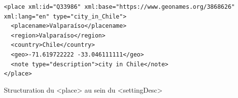 \begin{listing}[h]
	        \begin{verbatim}
<place xml:id="Q33986" xml:base="https://www.geonames.org/3868626" xml:lang="en" type="city_in_Chile">
  <placename>Valparaíso</placename>
  <region>Valparaíso</region>
  <country>Chile</country>
  <geo>-71.619722222 -33.046111111</geo>
  <note type="description">city in Chile</note>
</place>
	        \end{verbatim}
        	\caption{Structuration du <place> au sein du <settingDesc>}
        	\label{code:ent_loc}
\end{listing}